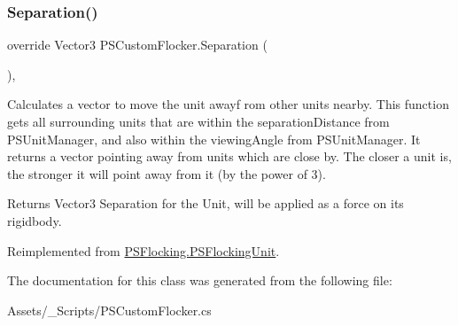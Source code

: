 \subsubsection{\texorpdfstring{Separation()}{Separation()}}
{\footnotesize\ttfamily override Vector3 P\+S\+Custom\+Flocker.\+Separation (\begin{DoxyParamCaption}{ }\end{DoxyParamCaption})\hspace{0.3cm}{\ttfamily [protected]}, {\ttfamily [virtual]}}



Calculates a vector to move the unit awayf rom other units nearby. This function gets all surrounding units that are within the separation\+Distance from P\+S\+Unit\+Manager, and also within the viewing\+Angle from P\+S\+Unit\+Manager. It returns a vector pointing away from units which are close by. The closer a unit is, the stronger it will point away from it (by the power of 3). 

\begin{DoxyReturn}{Returns}
Vector3 Separation for the Unit, will be applied as a force on its rigidbody. 
\end{DoxyReturn}


Reimplemented from \hyperlink{class_p_s_flocking_1_1_p_s_flocking_unit_af486901d480a5520aeae135d46635e60}{P\+S\+Flocking.\+P\+S\+Flocking\+Unit}.



The documentation for this class was generated from the following file\+:\begin{DoxyCompactItemize}
\item 
Assets/\+\_\+\+Scripts/P\+S\+Custom\+Flocker.\+cs\end{DoxyCompactItemize}
